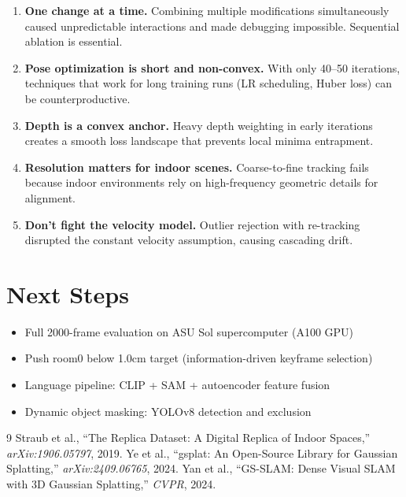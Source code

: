 \documentclass[10pt,twocolumn]{article}
\begin{document}
\begin{enumerate}
    \item \textbf{One change at a time.} Combining multiple modifications simultaneously caused unpredictable interactions and made debugging impossible. Sequential ablation is essential.
    \item \textbf{Pose optimization is short and non-convex.} With only 40--50 iterations, techniques that work for long training runs (LR scheduling, Huber loss) can be counterproductive.
    \item \textbf{Depth is a convex anchor.} Heavy depth weighting in early iterations creates a smooth loss landscape that prevents local minima entrapment.
    \item \textbf{Resolution matters for indoor scenes.} Coarse-to-fine tracking fails because indoor environments rely on high-frequency geometric details for alignment.
    \item \textbf{Don't fight the velocity model.} Outlier rejection with re-tracking disrupted the constant velocity assumption, causing cascading drift.
\end{enumerate}

\section{Next Steps}

\begin{itemize}
    \item Full 2000-frame evaluation on ASU Sol supercomputer (A100 GPU)
    \item Push room0 below 1.0cm target (information-driven keyframe selection)
    \item Language pipeline: CLIP + SAM + autoencoder feature fusion
    \item Dynamic object masking: YOLOv8 detection and exclusion
\end{itemize}

\begin{thebibliography}{9}
 Straub et al., ``The Replica Dataset: A Digital Replica of Indoor Spaces,'' \emph{arXiv:1906.05797}, 2019.
 Ye et al., ``gsplat: An Open-Source Library for Gaussian Splatting,'' \emph{arXiv:2409.06765}, 2024.
 Yan et al., ``GS-SLAM: Dense Visual SLAM with 3D Gaussian Splatting,'' \emph{CVPR}, 2024.
\end{thebibliography}
\end{document}
